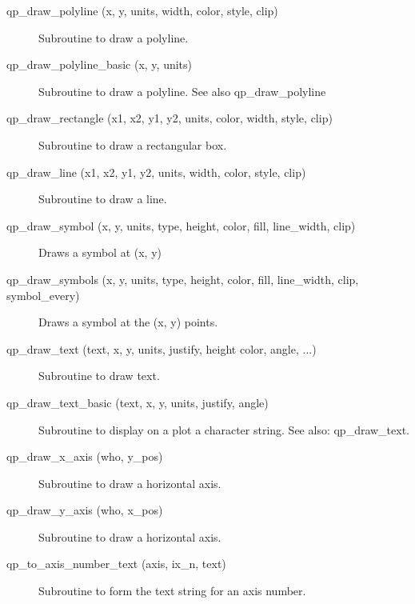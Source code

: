 \begin{description}
\item[qp\_draw\_polyline (x, y, units, width, color, style, clip)] \Newline 
     Subroutine to draw a polyline.

\item[qp\_draw\_polyline\_basic (x, y, units) ] \Newline 
     Subroutine to draw a polyline. See also qp\_draw\_polyline

\item[qp\_draw\_rectangle (x1, x2, y1, y2, units, color, width,
                                             style, clip) ] \Newline 
     Subroutine to draw a rectangular box.

\item[qp\_draw\_line (x1, x2, y1, y2, units, width, color, style, clip)] \Newline 
     Subroutine to draw a line.

\item[qp\_draw\_symbol (x, y, units, type, height, color, 
                                fill, line\_width, clip) ] \Newline 
     Draws a symbol at (x, y) 

\item[qp\_draw\_symbols (x, y, units, type, height, color,
            fill, line\_width, clip, symbol\_every) ] \Newline 
     Draws a symbol at the (x, y) points. 

\item[qp\_draw\_text (text, x, y, units, justify, height
        color, angle, ...) ] \Newline 
     Subroutine to draw text.

\item[qp\_draw\_text\_basic (text, x, y, units, justify, angle)] \Newline 
     Subroutine to display on a plot a character string.
     See also: qp\_draw\_text.

\item[qp\_draw\_x\_axis (who, y\_pos)] \Newline 
     Subroutine to draw a horizontal axis.

\item[qp\_draw\_y\_axis (who, x\_pos)] \Newline 
     Subroutine to draw a horizontal axis.

\item[qp\_to\_axis\_number\_text (axis, ix\_n, text)] \Newline 
     Subroutine to form the text string for an axis number.

\end{description}

